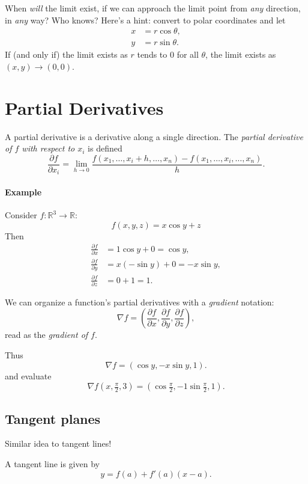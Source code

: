 \documentclass[11pt]{article}
\begin{document}
When \emph{will} the limit exist, if we can approach the limit point from \emph{any} direction, in \emph{any} way? Who knows? Here's a hint: convert to polar coordinates and let
\begin{align*}
    x &= r \cos \theta, \\
    y &= r \sin \theta.
\end{align*}
If (and only if) the limit exists as \(r\) tends to \(0\) for all \(\theta\), the limit exists as \((x, y) \to (0, 0)\).

\section*{Partial Derivatives}

A partial derivative is a derivative along a single direction. The \emph{partial derivative of \(f\) with respect to \(x_i\)} is defined
\[
    \frac{\partial f}{\partial x_i} = \lim_{h \to 0} \frac{f(x_1, \dots, x_i + h, \dots, x_n) - f(x_1, \dots, x_i, \dots, x_n)}{h}.
\]

\paragraph{Example}

Consider \(f\colon \mathbb R^3 \to \mathbb R\):
\[
    f(x, y, z) = x \cos y + z
\]
Then
\begin{align*}
    \frac{\partial f}{\partial x} &= 1 \cos y + 0 = \cos y, \\
    \frac{\partial f}{\partial y} &= x (- \sin y) + 0 = -x \sin y, \\
    \frac{\partial f}{\partial z} &= 0 + 1 = 1.
\end{align*}

We can organize a function's partial derivatives with a \emph{gradient} notation:
\[
    \nabla f = \left(\frac{\partial f}{\partial x}, \frac{\partial f}{\partial y}, \frac{\partial f}{\partial z}\right),
\]
read as the \emph{gradient of \(f\)}.

Thus
\[
    \nabla f = (\cos y, -x \sin y, 1).
\]
and evaluate
\[
    \nabla f(x, \tfrac \pi 2, 3) = (\cos \tfrac \pi 2, -1 \sin \tfrac \pi 2, 1).
\]

\subsection*{Tangent planes}

Similar idea to tangent lines!

A tangent line is given by
\[
    y = f(a) + f'(a) (x-a).
\]
\end{document}
